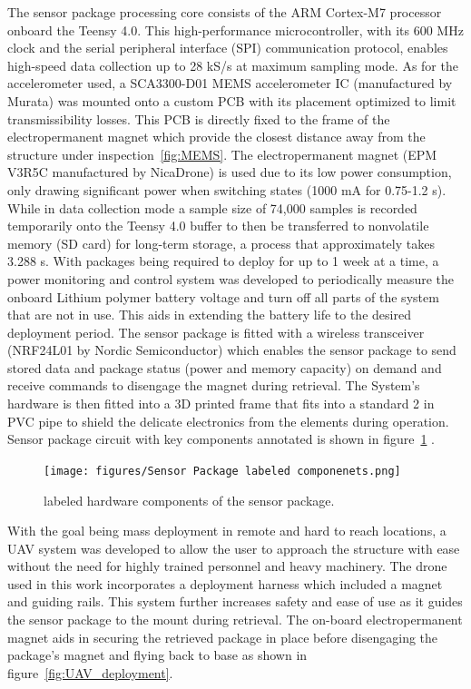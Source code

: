 \documentclass[]{spie}  %
\begin{document}
	The sensor package processing core consists of the ARM Cortex-M7 processor onboard the Teensy 4.0. This high-performance microcontroller, with its 600 MHz clock and the serial peripheral interface (SPI) communication protocol, enables high-speed data collection up to 28 kS/s at maximum sampling mode. As for the accelerometer used, a SCA3300-D01 MEMS accelerometer IC (manufactured by Murata) was mounted onto a custom PCB with its placement optimized to limit transmissibility losses. This PCB is directly fixed to the frame of the electropermanent magnet which provide the closest distance away from the structure under inspection~\ref{fig:MEMS}. The electropermanent magnet (EPM V3R5C manufactured by NicaDrone) is used due to its low power consumption, only drawing significant power when switching states (1000 mA for 0.75-1.2 s). While in data collection mode a sample size of 74,000 samples is recorded temporarily onto the Teensy 4.0 buffer to then be transferred to nonvolatile memory (SD card) for long-term storage, a process that approximately takes 3.288 s. With packages being required to deploy for up to 1 week at a time, a power monitoring and control system was developed to periodically measure the onboard Lithium polymer battery voltage and turn off all parts of the system that are not in use. This aids in extending the battery life to the desired deployment period. The sensor package is fitted with a wireless transceiver (NRF24L01 by Nordic Semiconductor) which enables the sensor package to send stored data and package status (power and memory capacity) on demand and receive commands to disengage the magnet during retrieval. The System's hardware is then fitted into a 3D printed frame that fits into a standard 2 in PVC pipe to shield the delicate electronics from the elements during operation. Sensor package circuit with key components annotated is shown in figure~\ref{fig:Sensor_Package_labeled_componenets} \cite{Carroll2021}.

	\begin{figure} [H]
	\centering
	\texttt{[image: figures/Sensor Package labeled componenets.png]}
	\caption{labeled hardware components of the sensor package. }
	\label{fig:Sensor_Package_labeled_componenets}
	\end{figure}
	

	
	With the goal being mass deployment in remote and hard to reach locations, a UAV system was developed to allow the user to approach the structure with ease without the need for highly trained personnel and heavy machinery. The drone used in this work incorporates a deployment harness which included a magnet  and guiding rails. This system further increases safety and ease of use as it guides the sensor package to the mount during retrieval. The on-board electropermanent magnet aids in securing the retrieved package in place before disengaging the package’s magnet and flying back to base as shown in figure~\ref{fig:UAV_deployment}\cite{Carroll2021}.
\end{document}
